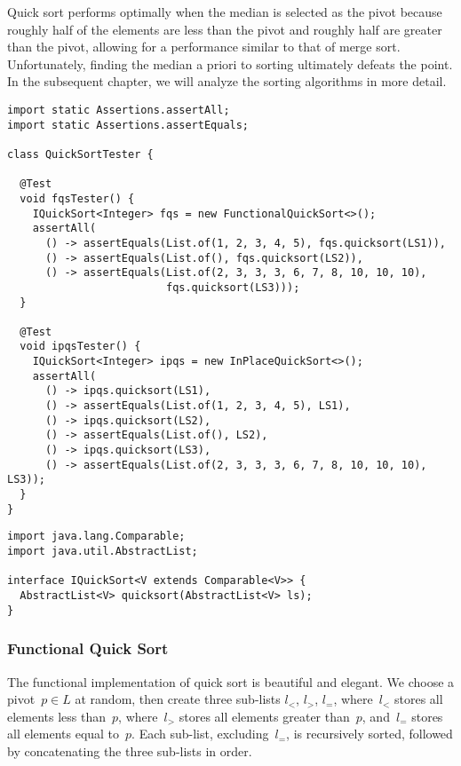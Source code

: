 Quick sort performs optimally when the median is selected as the pivot because roughly half of the elements are less than the pivot and roughly half are greater than the pivot, allowing for a performance similar to that of merge sort. 
Unfortunately, finding the median a priori to sorting ultimately defeats the point. 
In the subsequent chapter, we will analyze the sorting algorithms in more detail.

\begin{lstlisting}[language=MyJava]
import static Assertions.assertAll;
import static Assertions.assertEquals;

class QuickSortTester {

  @Test
  void fqsTester() {
    IQuickSort<Integer> fqs = new FunctionalQuickSort<>();
    assertAll(
      () -> assertEquals(List.of(1, 2, 3, 4, 5), fqs.quicksort(LS1)),
      () -> assertEquals(List.of(), fqs.quicksort(LS2)),
      () -> assertEquals(List.of(2, 3, 3, 3, 6, 7, 8, 10, 10, 10), 
                         fqs.quicksort(LS3)));
  }

  @Test
  void ipqsTester() {
    IQuickSort<Integer> ipqs = new InPlaceQuickSort<>();
    assertAll(
      () -> ipqs.quicksort(LS1),
      () -> assertEquals(List.of(1, 2, 3, 4, 5), LS1),
      () -> ipqs.quicksort(LS2),
      () -> assertEquals(List.of(), LS2),
      () -> ipqs.quicksort(LS3),
      () -> assertEquals(List.of(2, 3, 3, 3, 6, 7, 8, 10, 10, 10), LS3));
  }
}
\end{lstlisting}

\begin{lstlisting}[language=MyJava]
import java.lang.Comparable;
import java.util.AbstractList;

interface IQuickSort<V extends Comparable<V>> {
  AbstractList<V> quicksort(AbstractList<V> ls);
}
\end{lstlisting}

\newpage
\subsubsection*{Functional Quick Sort}
The functional implementation of quick sort is beautiful and elegant. 
We choose a pivot~$p \in L$ at random, then create three sub-lists $l_<$, $l_>$, $l_=$, where~$l_<$ stores all elements less than~$p$, where~$l_>$ stores all elements greater than~$p$, and~$l_=$ stores all elements equal to~$p$. 
Each sub-list, excluding~$l_=$, is recursively sorted, followed by concatenating the three sub-lists in order. 

